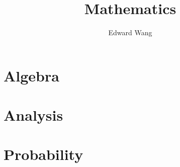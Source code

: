 \documentclass[a4paper, oneside, DIV=calc]{scrbook}
\begin{document}
\title{Mathematics}
\author{Edward Wang}
\date{\the\year}
\maketitle

\tableofcontents

\part{Algebra}


\part{Analysis}

\part{Probability}

\end{document}
